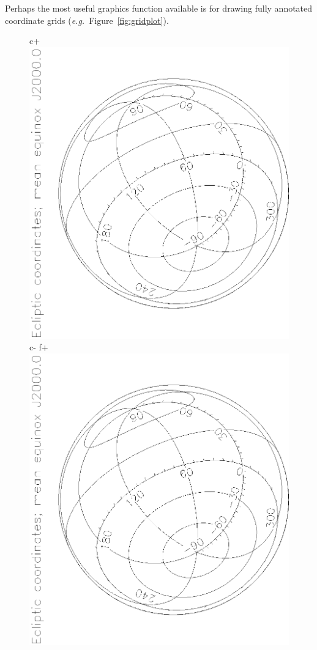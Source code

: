 \documentclass[twoside,11pt]{article}
\newenvironment{latexonly}{}{}
\begin{document}
\begin{latexonly}
   Perhaps the most useful graphics function available is for drawing
   fully annotated coordinate grids ({\em{e.g.}}\ Figure~\ref{fig:gridplot}).
   \begin{figure}
   \begin{center}
c+
   \includegraphics[scale=0.8,angle=-90]{sun211_figures/gridplot_bw.eps}
c-
f+
   \includegraphics[scale=0.8,angle=-90]{sun210_figures/gridplot_bw.eps}

\end{center}
\end{figure}
\end{latexonly}
\end{document}

